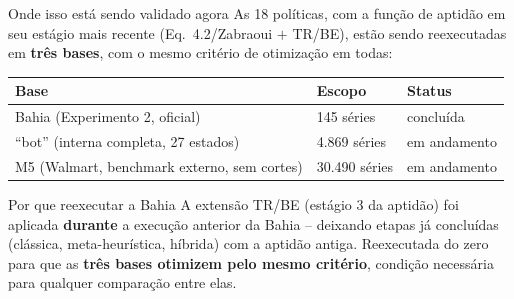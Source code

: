 \begin{frame}{Onde isso está sendo validado agora}
  \small As 18 políticas, com a função de aptidão em seu estágio mais
  recente (Eq.~4.2/Zabraoui $+$ TR/BE), estão sendo reexecutadas em
  \textbf{três bases}, com o mesmo critério de otimização em todas:
  \vspace{0.4em}

  \tabstyle\footnotesize
  \begin{tabular}{@{}lll@{}}
    \toprule
    \textbf{Base} & \textbf{Escopo} & \textbf{Status} \\
    \midrule
    Bahia (Experimento 2, oficial) & 145 séries & concluída \\
    ``bot'' (interna completa, 27 estados) & 4.869 séries & em andamento \\
    M5 (Walmart, benchmark externo, sem cortes) & 30.490 séries & em andamento \\
    \bottomrule
  \end{tabular}
  \vspace{1em}

  \begin{block}{Por que reexecutar a Bahia}
    \small A extensão TR/BE (estágio 3 da aptidão) foi aplicada
    \textbf{durante} a execução anterior da Bahia -- deixando etapas já
    concluídas (clássica, meta-heurística, híbrida) com a aptidão antiga.
    Reexecutada do zero para que as \textbf{três bases otimizem pelo mesmo
    critério}, condição necessária para qualquer comparação entre elas.
  \end{block}

\end{frame}
